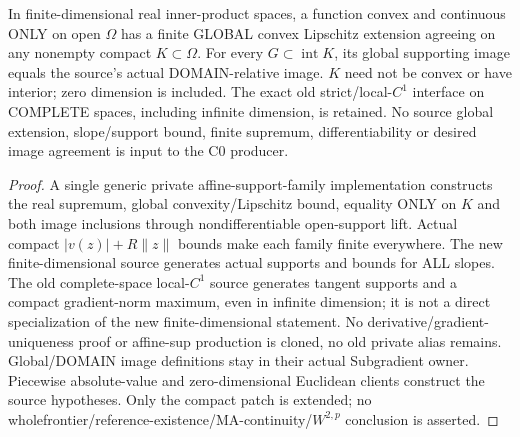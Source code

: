 \begin{lemma}
  \label{lem:convex-compact-extension}
  \leanok
  In finite-dimensional real inner-product spaces, a function convex and
  continuous ONLY on open $\Omega$ has a finite GLOBAL convex Lipschitz
  extension agreeing on any nonempty compact $K\subset\Omega$.
  For every $G\subset\operatorname{int}K$, its global supporting image equals
  the source's actual DOMAIN-relative image. $K$ need not be convex or have
  interior; zero dimension is included. The exact old strict/local-$C^1$
  interface on COMPLETE spaces, including infinite dimension, is retained.
  No source global extension, slope/support bound, finite supremum,
  differentiability or desired image agreement is input to the C0 producer.
\end{lemma}
\begin{proof}
  \leanok
  A single generic private affine-support-family implementation constructs
  the real supremum, global convexity/Lipschitz bound, equality ONLY on $K$
  and both image inclusions through nondifferentiable open-support lift.
  Actual compact $|v(z)|+R\|z\|$ bounds make each family finite everywhere.
  The new finite-dimensional source generates actual supports and bounds
  for ALL slopes. The old complete-space local-$C^1$ source generates tangent
  supports and a compact gradient-norm maximum, even in infinite dimension;
  it is not a direct specialization of the new finite-dimensional statement.
  No derivative/gradient-uniqueness proof or affine-sup production is cloned,
  no old private alias remains. Global/DOMAIN image definitions stay in their
  actual Subgradient owner. Piecewise absolute-value and zero-dimensional
  Euclidean clients construct the source hypotheses. Only the compact patch
  is extended; no wholefrontier/reference-existence/MA-continuity/$W^{2,p}$
  conclusion is asserted.
\end{proof}

